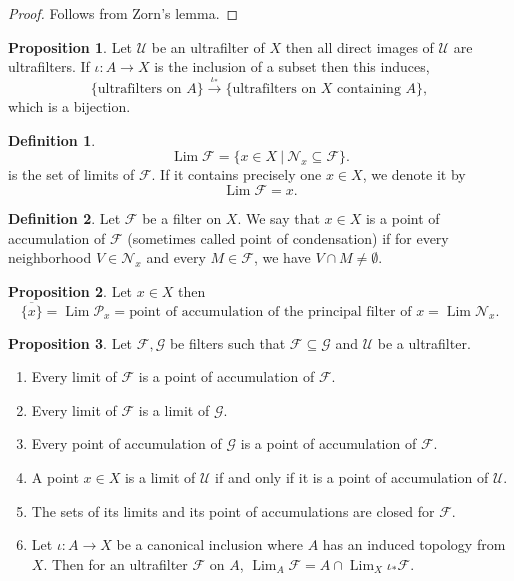 \documentclass[10pt]{article}
\numberwithin{equation}{section}
\theoremstyle{definition}
\newtheorem{proposition}{Proposition}[subsection]
\newtheorem{definition}{Definition}[subsection]
\DeclareMathOperator{\Lim}{Lim}
\newcommand{\F}[0]{\mathcal{F}}
\newcommand{\U}[0]{\mathcal{U}}
\newcommand{\sep}[0]{\:|\:}
\newcommand{\cF}[0]{\mathcal{F}}
\begin{document}
\begin{proof}
    Follows from Zorn's lemma.
\end{proof}
\begin{proposition}
    \label{proposition_bijection_ultrafilters}
    Let $\mathcal{U}$ be an ultrafilter of $X$ then all direct images of $\mathcal{U}$ are ultrafilters. If $\iota:A\to X$ is the inclusion of a subset then this induces,
    \begin{equation*}
        \{\text{ultrafilters on $A$}\}\stackrel{\iota_*}{\to}\{\text{ultrafilters on $X$ containing $A$}\},
    \end{equation*}
    which is a bijection.
\end{proposition}
\begin{definition}
    \begin{equation*}
        \Lim\mathcal{F} = \{x\in X\sep \mathcal{N}_x\subseteq\mathcal{F}\}.
    \end{equation*}
    is the set of limits of $\mathcal{F}$. If it contains precisely one $x\in X$, we denote it by
    \begin{equation*}
        \Lim\mathcal{F} = x.
    \end{equation*}
\end{definition}
\begin{definition}
    \label{definition_9}
    Let $\mathcal{F}$ be a filter on $X$. We say that $x\in X$ is a point of accumulation of $\mathcal{F}$ (sometimes called point of condensation) if for every neighborhood $V\in\mathcal{N}_x$ and every $M\in\mathcal{F}$, we have $V\cap M\not=\emptyset$.
\end{definition}
\begin{proposition}
    Let $x\in X$ then
    \begin{equation*}
        \overline{\{x\}} = \Lim\mathcal{P}_x = \text{point of accumulation of the principal filter of $x$} = \Lim\mathcal{N}_x.
    \end{equation*}
\end{proposition}
\begin{proposition}Let $\F,\mathcal{G}$ be filters such that $\F\subseteq\mathcal{G}$ and $\U$ be a ultrafilter.
    \label{fact_11}
    \label{proposition_2_11}
    \begin{enumerate}[1.]
        \item Every limit of $\F$ is a point of accumulation of $\F$.
        \item Every limit of $\F$ is a limit of $\mathcal{G}$.
        \item Every point of accumulation of $\mathcal{G}$ is a point of accumulation of $\F$.
        \item A point $x\in X$ is a limit of $\U$ if and only if it is a point of accumulation of $\U$.
        \item The sets of its limits and its point of accumulations are closed for $\F$.
        \item Let $\iota:A\to X$ be a canonical inclusion where $A$ has an induced topology from $X$. Then for an ultrafilter $\cF$ on $A$, $\Lim_A\F = A\cap\Lim_X\iota_*\F$.
    \end{enumerate}
\end{proposition}
\end{document}
